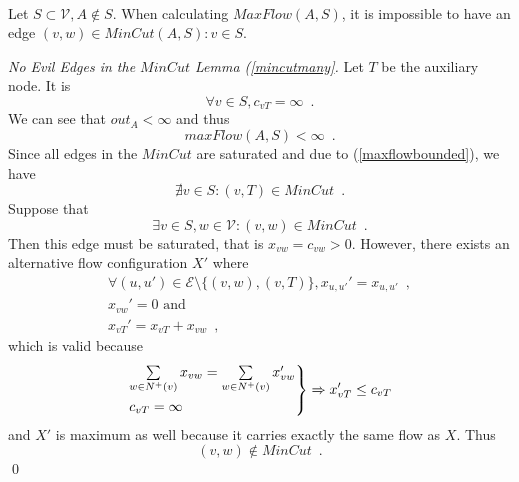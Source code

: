 
    \begin{lemma} \ \\
       \label{mincutmany}
       Let $S \subset \mathcal{V}, A \notin S$. When calculating $MaxFlow\left(A, S\right)$, it is impossible to have an edge
       $\left(v, w\right) \in MinCut\left(A, S\right) : v \in S$.
    \end{lemma}
    \begin{proof}[No Evil Edges in the $MinCut$ Lemma (\ref{mincutmany}]
    \label{mincutmanyproof}
       Let $T$ be the auxiliary node. It is
       \begin{equation}
          \forall v \in S, c_{vT} = \infty \enspace.
       \end{equation}
       We can see that $out_A < \infty$ and thus
       \begin{equation}
       \label{maxflowbounded}
          maxFlow\left(A, S\right) < \infty \enspace.
       \end{equation}
       Since all edges in the $MinCut$ are saturated and due to (\ref{maxflowbounded}), we have
       \begin{equation}
          \nexists v \in S : \left(v, T\right) \in MinCut \enspace.
       \end{equation}
       Suppose that
       \begin{equation}
          \exists v \in S, w \in \mathcal{V} : \left(v, w\right) \in MinCut \enspace.
       \end{equation}
       Then this edge must be saturated, that is $x_{vw} = c_{vw} > 0$. However, there exists an alternative flow
       configuration $X'$ where
       \begin{equation}
       \begin{gathered}
          \forall \left(u, u'\right) \in \mathcal{E} \setminus \{\left(v, w\right), \left(v, T\right)\}, x_{u,u'}' =
          x_{u,u'} \enspace, \\
          x_{vw}' = 0 \mbox{ and} \\
          x_{vT}' = x_{vT} + x_{vw} \enspace,
       \end{gathered}
       \end{equation}
       which is valid because
       \begin{equation}
          \begin{rcases}
             \sum\limits_{w \in N^{+}\left(v\right)}x_{vw} = \sum\limits_{w \in N^{+}\left(v\right)}x_{vw}' \\
             c_{vT} = \infty
          \end{rcases}
          \Rightarrow x_{vT}' \leq c_{vT}
       \end{equation}
       and $X'$ is maximum as well because it carries exactly the same flow as $X$. Thus
       \begin{equation}
          \left(v, w\right) \notin MinCut \enspace.
       \end{equation}
       \qed
    \end{proof}


